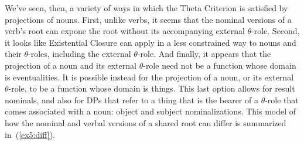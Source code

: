 We've seen, then, a variety of ways in which the Theta Criterion is satisfied by projections of nouns. First, unlike verbs, it seems that the nominal versions of a verb's root can expone the root without its accompanying external $\theta$-role. Second, it looks like Existential Closure can apply in a less constrained way to nouns and their $\theta$-roles, including the external $\theta$-role. And finally, it appears that the projection of a noun and its external $\theta$-role need not be a function whose domain is eventualities. It is possible instead for the projection of a noun, or its external $\theta$-role, to be a function whose domain is things. This last option allows for result nominals, and also for DPs that refer to a thing that is the bearer of a $\theta$-role that comes associated with a noun: object and subject nominalizations. This model of how the nominal and verbal versions of a shared root can differ is summarized in~(\ref{ex5:diff}).
